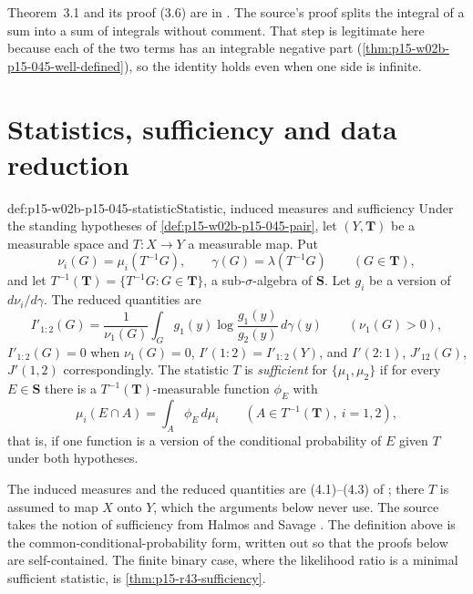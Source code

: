 Theorem~3.1 and its proof (3.6) are in
\cite[pp.~82--83]{KullbackLeibler1951Information}. The source's proof
splits the integral of a sum into a sum of integrals without comment.
That step is legitimate here because each of the two terms has an
integrable negative part (\cref{thm:p15-w02b-p15-045-well-defined}),
so the identity holds even when one side is infinite.

\section{Statistics, sufficiency and data reduction}
\label{sec:p15-w02b-p15-045-sufficiency}

\begin{hbdefinition}{def:p15-w02b-p15-045-statistic}{Statistic, induced measures and sufficiency}
Under the standing hypotheses of \cref{def:p15-w02b-p15-045-pair},
let \((Y,\mathbf T)\) be a measurable space and
\(T:X\to Y\) a measurable map. Put
\[
  \nu_i(G)=\mu_i(T^{-1}G),\qquad
  \gamma(G)=\lambda(T^{-1}G)\qquad(G\in\mathbf T),
\]
and let \(T^{-1}(\mathbf T)=\{T^{-1}G:G\in\mathbf T\}\), a
sub-\(\sigma\)-algebra of \(\mathbf S\). Let \(g_i\) be a version of
\(d\nu_i/d\gamma\). The reduced quantities are
\[
  I'_{1:2}(G)=\frac1{\nu_1(G)}\int_G g_1(y)\log\frac{g_1(y)}{g_2(y)}\,d\gamma(y)
  \qquad(\nu_1(G)>0),
\]
\(I'_{1:2}(G)=0\) when \(\nu_1(G)=0\),
\(I'(1:2)=I'_{1:2}(Y)\), and \(I'(2:1)\), \(J'_{12}(G)\),
\(J'(1,2)\) correspondingly. The statistic \(T\) is \emph{sufficient}
for \(\{\mu_1,\mu_2\}\) if for every \(E\in\mathbf S\) there is a
\(T^{-1}(\mathbf T)\)-measurable function \(\phi_E\) with
\[
  \mu_i(E\cap A)=\int_A\phi_E\,d\mu_i
  \qquad(A\in T^{-1}(\mathbf T),\ i=1,2),
\]
that is, if one function is a version of the conditional probability of
\(E\) given \(T\) under both hypotheses.
\end{hbdefinition}

The induced measures and the reduced quantities are (4.1)--(4.3) of
\cite[p.~83]{KullbackLeibler1951Information}; there \(T\) is assumed to
map \(X\) onto \(Y\), which the arguments below never use. The source
takes the notion of sufficiency from Halmos and Savage
\cite[pp.~79 and~84]{KullbackLeibler1951Information}. The definition
above is the common-conditional-probability form, written out so that
the proofs below are self-contained. The finite binary case, where the
likelihood ratio is a minimal sufficient statistic, is
\cref{thm:p15-r43-sufficiency}.

